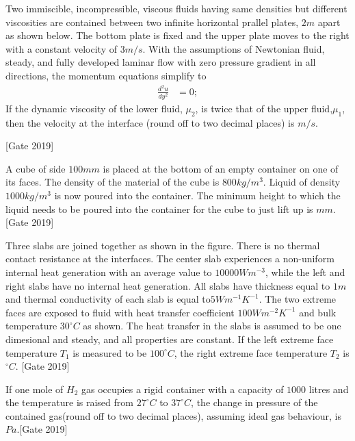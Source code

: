 	\item Two immiscible, incompressible, viscous fluids having same densities but different viscosities are contained between two infinite horizontal prallel plates, $2m$ apart as shown below. The bottom plate is fixed and the upper plate moves to the right with a constant velocity of $3m/s$. With the assumptions of Newtonian fluid, steady, and fully developed laminar flow with zero pressure gradient in all directions, the momentum equations simplify to
		\begin{align}
			\frac{d^2u}{dy^2} &= 0;
		\end{align}
If the dynamic viscosity of the lower fluid, $\mu_2$, is twice that of the upper fluid,$\mu_1$, then the velocity at the interface (round off to two decimal places) is \underline{\hspace{2cm}}$m/s$.
		
		\hfill{[Gate 2019]}
	\item A cube of side $100mm$ is placed at the bottom of an empty container on one of its faces. The density of the material of the cube is $800kg/{m^3}$. Liquid of density $1000 kg/{m^3}$ is now poured into the container. The minimum height to which the liquid needs to be poured into the container for the cube to just lift up is \underline{\hspace{2cm}}$mm$. \hfill{[Gate 2019]}
	\item Three slabs are joined together as shown in the figure. There is no thermal contact resistance at the interfaces. The center slab experiences a non-uniform internal heat generation with an average value to $10000 Wm^{-3}$, while the left and right slabs have no internal heat generation. All slabs have thickness equal to $1m$ and thermal conductivity of each slab is equal to$5Wm^{-1}K^{-1}$. The two extreme faces are exposed to fluid with heat transfer coefficient $100Wm^{-2}K^{-1}$ and bulk temperature $30^{\circ}C$ as shown. The heat transfer in the slabs is assumed to be one dimesional and steady, and all properties are constant. If the left extreme face temperature $T_1$ is measured to be $100^{\circ}C$, the right extreme face temperature $T_2$ is \underline{\hspace{2cm}}$^{\circ}C$.
			\hfill{[Gate 2019]}
	\item If one mole of $H_2$ gas occupies a rigid container with a capacity of $1000$ litres and the temperature is raised from $27^{\circ}C$ to $37^{\circ}C$, the change in pressure of the contained gas(round off to two decimal places), assuming ideal gas behaviour, is \underline{\hspace{2cm}}$Pa.$\hfill{[Gate 2019]}

